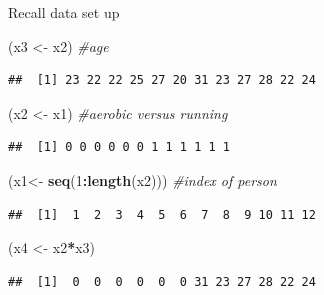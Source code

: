 \documentclass[
  ignorenonframetext,
]{beamer}
\newenvironment{Shaded}{\begin{snugshade}}{\end{snugshade}}
\newcommand{\CommentTok}[1]{\textcolor[rgb]{0.56,0.35,0.01}{\textit{#1}}}
\newcommand{\DecValTok}[1]{\textcolor[rgb]{0.00,0.00,0.81}{#1}}
\newcommand{\KeywordTok}[1]{\textcolor[rgb]{0.13,0.29,0.53}{\textbf{#1}}}
\newcommand{\NormalTok}[1]{#1}
\newcommand{\OperatorTok}[1]{\textcolor[rgb]{0.81,0.36,0.00}{\textbf{#1}}}
\newcommand{\StringTok}[1]{\textcolor[rgb]{0.31,0.60,0.02}{#1}}
\begin{document}
\begin{frame}[fragile]{Recall data set up}
\protect\hypertarget{recall-data-set-up-1}{}

\footnotesize

\begin{Shaded}
\begin{Highlighting}[]
\NormalTok{(x3 <-}\StringTok{ }\NormalTok{x2) }\CommentTok{#age}
\end{Highlighting}
\end{Shaded}

\begin{verbatim}
##  [1] 23 22 22 25 27 20 31 23 27 28 22 24
\end{verbatim}

\begin{Shaded}
\begin{Highlighting}[]
\NormalTok{(x2 <-}\StringTok{ }\NormalTok{x1) }\CommentTok{#aerobic versus running }
\end{Highlighting}
\end{Shaded}

\begin{verbatim}
##  [1] 0 0 0 0 0 0 1 1 1 1 1 1
\end{verbatim}

\begin{Shaded}
\begin{Highlighting}[]
\NormalTok{(x1<-}\StringTok{ }\KeywordTok{seq}\NormalTok{(}\DecValTok{1}\OperatorTok{:}\KeywordTok{length}\NormalTok{(x2))) }\CommentTok{#index of person}
\end{Highlighting}
\end{Shaded}

\begin{verbatim}
##  [1]  1  2  3  4  5  6  7  8  9 10 11 12
\end{verbatim}

\begin{Shaded}
\begin{Highlighting}[]
\NormalTok{(x4 <-}\StringTok{ }\NormalTok{x2}\OperatorTok{*}\NormalTok{x3)}
\end{Highlighting}
\end{Shaded}

\begin{verbatim}
##  [1]  0  0  0  0  0  0 31 23 27 28 22 24
\end{verbatim}

\end{frame}
\end{document}
